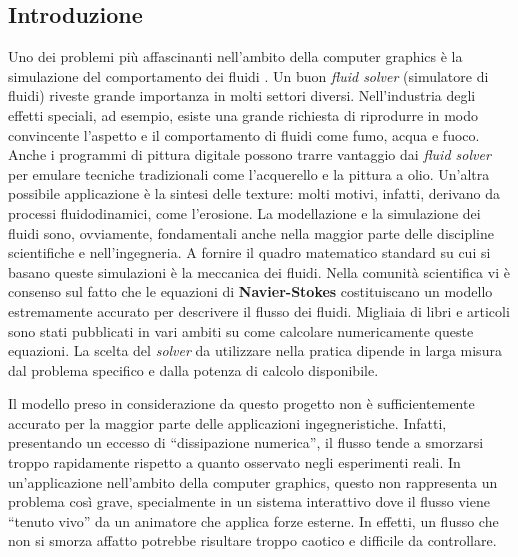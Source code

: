 \documentclass[12pt,a4paper,openany,twoside]{article}
\begin{document}
\subsection{Introduzione}


Uno dei problemi più affascinanti nell'ambito della computer graphics è la simulazione del comportamento dei fluidi \cite{abbott1989computational, 10.1145/311535.311548, fernando2004gpu, chorin2013mathematical}. Un buon \textit{fluid solver} (simulatore di fluidi) riveste grande importanza in molti settori diversi. Nell'industria degli effetti speciali, ad esempio, esiste una grande richiesta di riprodurre in modo convincente l'aspetto e il comportamento di fluidi come fumo, acqua e fuoco. Anche i programmi di pittura digitale possono trarre vantaggio dai \textit{fluid solver} per emulare tecniche tradizionali come l'acquerello e la pittura a olio. Un'altra possibile applicazione è la sintesi delle texture: molti motivi, infatti, derivano da processi fluidodinamici, come l'erosione. La modellazione e la simulazione dei fluidi sono, ovviamente, fondamentali anche nella maggior parte delle discipline scientifiche e nell'ingegneria. A fornire il quadro matematico standard su cui si basano queste simulazioni è la meccanica dei fluidi.
Nella comunità scientifica vi è consenso sul fatto che le equazioni di \textbf{Navier-Stokes} costituiscano un modello estremamente accurato per descrivere il flusso dei fluidi. Migliaia di libri e articoli sono stati pubblicati in vari ambiti su come calcolare numericamente queste equazioni. La scelta del \textit{solver} da utilizzare nella pratica dipende in larga misura dal problema specifico e dalla potenza di calcolo disponibile.

Il modello preso in considerazione da questo progetto non è sufficientemente accurato per la maggior parte delle applicazioni ingegneristiche. Infatti, presentando un eccesso di “dissipazione numerica”, il flusso tende a smorzarsi troppo rapidamente rispetto a quanto osservato negli esperimenti reali. In un’applicazione nell'ambito della computer graphics, questo non rappresenta un problema così grave, specialmente in un sistema interattivo dove il flusso viene “tenuto vivo” da un animatore che applica forze esterne. In effetti, un flusso che non si smorza affatto potrebbe risultare troppo caotico e difficile da controllare.
\end{document}
